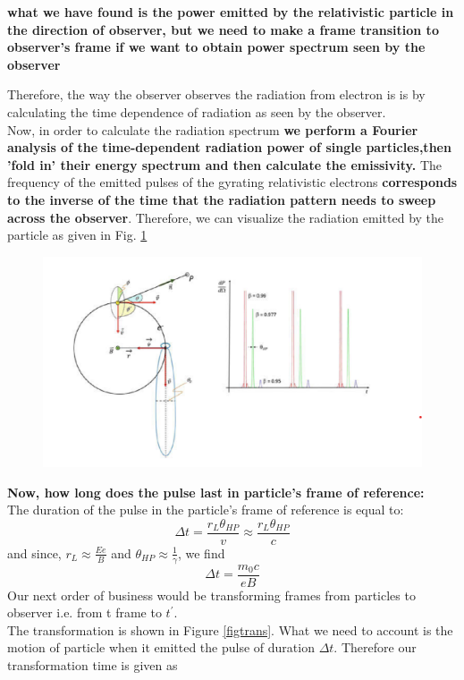 \documentclass[11pt]{report}
\newcommand{\cbox}{tcolorbox}
\begin{document}
\begin{\cbox}
\textbf{what we have found is the power emitted by the relativistic particle in the direction of observer, but we need to make a frame transition to observer's frame if we want to obtain power spectrum seen by the observer}
\end{\cbox}
Therefore, the way the observer observes the radiation from electron is is by calculating the time dependence of radiation as seen by the observer.\\
Now, in order to calculate the radiation spectrum \textbf{ we perform a Fourier analysis of the time-dependent radiation power of single particles,then 'fold in' their energy spectrum and then calculate the emissivity.} The frequency of the emitted pulses of the gyrating relativistic electrons \textbf{ corresponds to the inverse of the time that the radiation pattern needs to sweep across the observer}.
Therefore, we can visualize the radiation emitted by the particle as given in Fig. \ref{figobsrad}
\begin{figure}\label{figobsrad}
\includegraphics[scale=1]{figobsrad.png}
\end{figure}
\textbf{Now, how long does the pulse last in particle's frame of reference:}\\
The duration of the pulse in the particle's frame of reference is equal to:
\begin{equation}
\Delta t =\frac{r_L\theta_{HP}}{v}\approx \frac{r_L \theta_{HP}}{c}
\end{equation}
and since, $r_L \approx \frac{Ee}{B}$ and $\theta_{HP}\approx \frac{1}{\gamma}$, we find 
\begin{equation}
\Delta t =\frac{m_0 c}{e B}
\end{equation}
Our next order of business would be transforming frames from particles to observer i.e. from t frame to $t^\prime$.\\
The transformation is shown in Figure \ref{figtrans}. What we need to account is the motion of particle when it emitted the pulse of duration $\Delta t$. Therefore our transformation time is given as 
\end{document}
